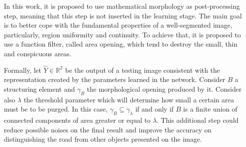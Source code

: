 In this work, it is proposed to use mathematical morphology as post-processing step, meaning that this step is not inserted in the learning stage. The main goal is to better cope with the fundamental properties of a well-segmented image, particularly, region uniformity and continuity. To achieve that, it is proposed to use a function filter, called area opening, which tend to destroy the small, thin and conspicuous areas.

Formally, let $\hat{Y}\in \mathbb{R}^2$ be the output of a testing image consistent with the representation created by the parameters learned in the network. Consider $B$ a structuring element and $\gamma_B$ the morphological opening produced by it. Consider also $\lambda$ the threshold parameter which will determine how small a certain area must be to be purged. In this case,  $\gamma_B \subseteq \gamma_\lambda$ if and only if $B$ is a finite union of connected components of area greater or equal to $\lambda$. This additional step could reduce possible noises on the final result and improve the accuracy on distinguishing the road from other objects presented on the image.

